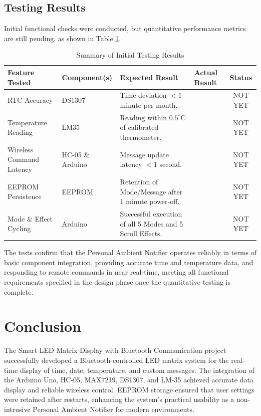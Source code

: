 \documentclass[a4paper, 10pt]{article}
\begin{document}
	\subsection{Testing Results}
	Initial functional checks were conducted, but quantitative performance metrics are still pending, as shown in Table \ref{tab:testing_results}.
	
	\begin{table}[htbp]
		\centering
		\caption{Summary of Initial Testing Results}
		\begin{tabular}{@{}llllc@{}}
			\toprule
			\textbf{Feature Tested} & \textbf{Component(s)} & \textbf{Expected Result} & \textbf{Actual Result} & \textbf{Status} \\
			\midrule
			RTC Accuracy & DS1307 & Time deviation $< 1$ minute per month. & \textit{} & NOT YET \\
			Temperature Reading & LM35 & Reading within $0.5^\circ\text{C}$ of calibrated thermometer. & \textit{} & NOT YET \\
			Wireless Command Latency & HC-05 \& Arduino & Message update latency $< 1$ second. & \textit{} & NOT YET \\
			EEPROM Persistence & EEPROM & Retention of Mode/Message after 1 minute power-off. & \textit{} & NOT YET \\
			Mode \& Effect Cycling & Arduino & Successful execution of all 5 Modes and 5 Scroll Effects. & \textit{} & NOT YET \\
			\bottomrule
		\end{tabular}
		\label{tab:testing_results}
	\end{table}
	
	The tests confirm that the Personal Ambient Notifier operates reliably in terms of basic component integration, providing accurate time and temperature data, and responding to remote commands in near real-time, meeting all functional requirements specified in the design phase once the quantitative testing is complete.
	
	\section{Conclusion}
	The Smart LED Matrix Display with Bluetooth Communication project successfully developed a Bluetooth-controlled LED matrix system for the real-time display of time, date, temperature, and custom messages. The integration of the Arduino Uno, HC-05, MAX7219, DS1307, and LM-35 achieved accurate data display and reliable wireless control. EEPROM storage ensured that user settings were retained after restarts, enhancing the system's practical usability as a non-intrusive Personal Ambient Notifier for modern environments.
	
\end{document}

